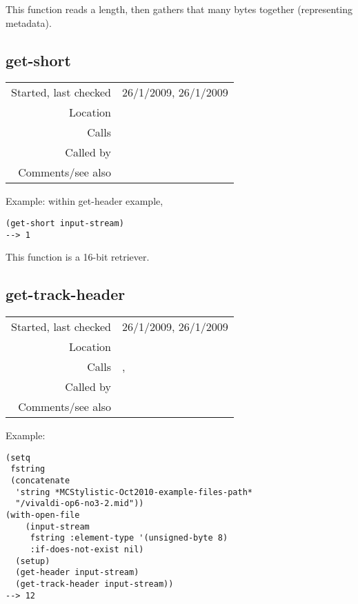 \noindent This function reads a length, then gathers
that many bytes together (representing metadata).


\subsection*{get-short}\label{fun:get-short}

\vspace{0.3cm}
\begin{tabular}{r|p{8cm}}
Started, last checked & 26/1/2009, 26/1/2009 \\
Location & \nameref{sec:MIDI-import} \\
Calls & \\
Called by & \nameref{fun:get-header} \\
Comments/see also & \nameref{fun:get-word}
\end{tabular}

\vspace{0.5cm}
\noindent Example: within get-header example,
\begin{verbatim}
(get-short input-stream)
--> 1
\end{verbatim}

\noindent This function is a 16-bit retriever.


\subsection*{get-track-header}\label{fun:get-track-header}

\vspace{0.3cm}
\begin{tabular}{r|p{8cm}}
Started, last checked & 26/1/2009, 26/1/2009 \\
Location & \nameref{sec:MIDI-import} \\
Calls & \nameref{fun:get-type}, \nameref{fun:get-word} \\
Called by & \nameref{fun:read-track} \\
Comments/see also &
\end{tabular}

\vspace{0.5cm}
\noindent Example:
\begin{verbatim}
(setq
 fstring
 (concatenate
  'string *MCStylistic-Oct2010-example-files-path*
  "/vivaldi-op6-no3-2.mid"))
(with-open-file
    (input-stream
     fstring :element-type '(unsigned-byte 8)
     :if-does-not-exist nil)
  (setup)
  (get-header input-stream)
  (get-track-header input-stream))
--> 12
\end{verbatim}

